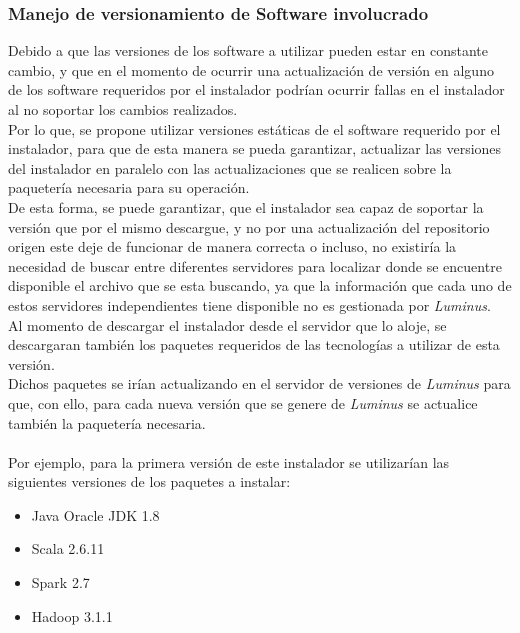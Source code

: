 \subsubsection{Manejo de versionamiento de Software involucrado}
Debido a que las versiones de los software a utilizar pueden estar en constante cambio, y que en el momento de ocurrir una actualización de versión en alguno de los software requeridos por el instalador podrían ocurrir fallas en el instalador al no soportar los cambios realizados.
\\
Por lo que, se propone utilizar versiones estáticas de el software requerido por el instalador, para que de esta manera se pueda garantizar, actualizar las versiones del instalador en paralelo con las actualizaciones que se realicen sobre la paquetería necesaria para su operación.
\\
De esta forma, se puede garantizar, que el instalador sea capaz de soportar la versión que por el mismo descargue, y no por una actualización del repositorio origen este deje de funcionar de manera correcta o incluso, no existiría la necesidad de buscar entre diferentes servidores para localizar donde se encuentre disponible el archivo que se esta buscando, ya que la información que cada uno de estos servidores independientes tiene disponible no es gestionada por \emph{Luminus}.
\\
Al momento de descargar el instalador desde el servidor que lo aloje, se descargaran también los paquetes requeridos de las tecnologías a utilizar de esta versión.
\\
Dichos paquetes se irían actualizando en el servidor de versiones de \emph{Luminus} para que, con ello, para cada nueva versión que se genere de \emph{Luminus} se actualice también la paquetería necesaria.
\\
\\
Por ejemplo, para la primera versión de este instalador se utilizarían las siguientes versiones de los paquetes a instalar:
\begin{itemize}
	\item Java Oracle JDK 1.8
	\item Scala 2.6.11
	\item Spark 2.7
	\item Hadoop 3.1.1
	
\end{itemize}
